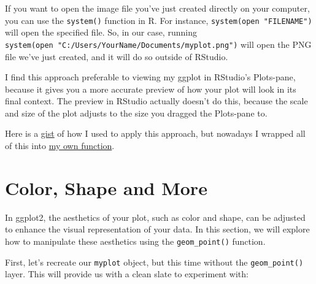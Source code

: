 \documentclass[
  letterpaper,
  DIV=11,
  numbers=noendperiod]{scrartcl}
\begin{document}
\begin{tcolorbox}[enhanced jigsaw, left=2mm, title=\textcolor{quarto-callout-tip-color}{\faLightbulb}\hspace{0.5em}{Tip}, toprule=.15mm, colback=white, coltitle=black, opacityback=0, breakable, titlerule=0mm, bottomtitle=1mm, toptitle=1mm, colbacktitle=quarto-callout-tip-color!10!white, arc=.35mm, rightrule=.15mm, bottomrule=.15mm, leftrule=.75mm, colframe=quarto-callout-tip-color-frame, opacitybacktitle=0.6]

If you want to open the image file you've just created directly on your
computer, you can use the \texttt{system()} function in R. For instance,
\texttt{system(\textquotesingle{}open\ "FILENAME"\textquotesingle{})}
will open the specified file. So, in our case, running
\texttt{system(\textquotesingle{}open\ "C:/Users/YourName/Documents/myplot.png"\textquotesingle{})}
will open the PNG file we've just created, and it will do so outside of
RStudio.

I find this approach preferable to viewing my ggplot in RStudio's
Plots-pane, because it gives you a more accurate preview of how your
plot will look in its final context. The preview in RStudio actually
doesn't do this, because the scale and size of the plot adjusts to the
size you dragged the Plots-pane to.

Here is a
\href{https://gist.github.com/SchmidtPaul/5cd96b53449f5f50cbda725d4cdacf9b}{gist}
of how I used to apply this approach, but nowadays I wrapped all of this
into
\href{https://schmidtpaul.github.io/BioMathR/reference/gg_export.html}{my
own function}.

\end{tcolorbox}

\hypertarget{color-shape-and-more}{%
\section{Color, Shape and More}\label{color-shape-and-more}}

In ggplot2, the aesthetics of your plot, such as color and shape, can be
adjusted to enhance the visual representation of your data. In this
section, we will explore how to manipulate these aesthetics using the
\texttt{geom\_point()} function.

First, let's recreate our \texttt{myplot} object, but this time without
the \texttt{geom\_point()} layer. This will provide us with a clean
slate to experiment with:
\end{document}
